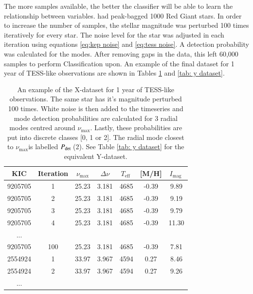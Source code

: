 \documentclass[a4paper,fleqn,usenatbib,useAMS]{mnras}
\newcommand{\numax}{\ensuremath{\nu_{\textrm{max}}}}
\newcommand{\dnu}{\ensuremath{\Delta\nu}}
\newcommand{\teff}{\ensuremath{T_{\textrm{eff}}\:}}
\newcommand{\pdet}{\ensuremath{P_{\rm det}\:}}
\newcommand{\imag}{\ensuremath{I_{\textrm{mag}}\:}}
\begin{document}
The more samples available, the better the classifier will be able to learn the relationship between variables. \citep{davies_asteroseismology_2016} had peak-bagged 1000 Red Giant stars. In order to increase the number of samples, the stellar magnitude was perturbed 100 times iteratively for every star. The noise level for the star was adjusted in each iteration using equations \ref{eq:kep noise} and \ref{eq:tess noise}. A detection probability was calculated for the modes. After removing gaps in the data, this left 60,000 samples to perform Classification upon. An example of the final dataset for 1 year of TESS-like observations are shown in Tables \ref{tab: x dataset} and \ref{tab: y dataset}.
\begin{table}
\begin{center}
\begin{tabular}{|*{7}{c|}}
KIC     & Iteration & \numax & \dnu & \teff & [M/H] & \imag \\
\hline
9205705	& 1         & 25.23	& 3.181 & 4685 & -0.39 & 9.89  \\
9205705	& 2         & 25.23	& 3.181 & 4685 & -0.39 & 9.19  \\
9205705	& 3         & 25.23	& 3.181 & 4685 & -0.39 & 9.79  \\
9205705	& 4         & 25.23	& 3.181 & 4685 & -0.39 & 11.30 \\
...                                                        \\
9205705	& 100       & 25.23	& 3.181 & 4685 & -0.39 & 7.81  \\
2554924	& 1	        & 33.97	& 3.967 	& 4594 &  0.27 & 8.46  \\
2554924	& 2         & 33.97	& 3.967 	& 4594 &  0.27 & 9.26  \\
...                                                         \\
\hline
\end{tabular}
\end{center}
\caption{An example of the X-dataset for 1 year of TESS-like observations. The same star has it's magnitude perturbed 100 times. White noise is then added to the timeseries and mode detection probabilities are calculated for 3 radial modes centred around \numax. Lastly, these probabilities are put into discrete classes [0, 1 or 2]. The radial mode closest to \numax is labelled \pdet(2). See Table \ref{tab: y dataset} for the equivalent Y-dataset.}
\label{tab: x dataset}
\end{table}
\end{document}
